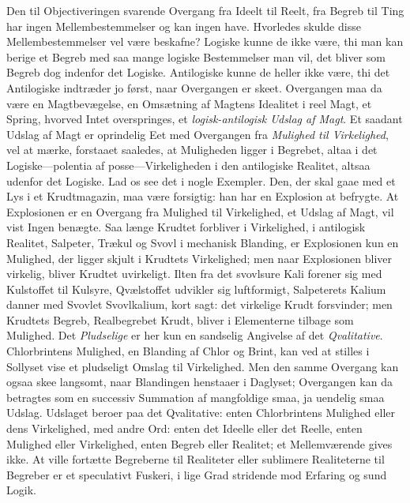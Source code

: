 \documentclass[12pt]{article}
\newcommand{\opage}[1]{\marginnote{\footnotesize\textit{[#1]}}}
\begin{document}
Den til Objectiveringen svarende Overgang fra Ideelt til Reelt, fra
Begreb til Ting har ingen Mellembestemmelser og kan ingen have.
Hvorledes skulde disse Mellembestemmelser vel være beskafne?
Logiske kunne de ikke være, thi man kan berige et Begreb med saa
mange logiske Bestemmelser man vil, det bliver som Begreb dog
indenfor det Logiske. Antilogiske kunne de heller ikke være, thi
det Antilogiske indtræder jo først, naar Overgangen er skeet.
Overgangen maa da være en Magtbevægelse, en Omsætning af Magtens
Idealitet i reel Magt, et Spring, hvorved Intet overspringes, et
\emph{logisk-antilogisk Udslag af Magt}. Et saadant Udslag af Magt
er oprindelig Eet med Overgangen fra \emph{Mulighed til Virkelighed},
vel at mærke, forstaaet saaledes, at Muligheden ligger i Begrebet,
altaa i det Logiske---polentia af posse---Virkeligheden i den
antilogiske Realitet, altsaa udenfor det Logiske. Lad os see det i
nogle Exempler. Den, der skal gaae med et Lys i et Krudtmagazin,
maa være forsigtig: han har en Explosion at befrygte. At Explosionen
er en Overgang fra Mulighed til Virkelighed, et Udslag af Magt, vil
vist Ingen benægte. Saa længe Krudtet forbliver i Virkelighed, i
antilogisk Realitet, Salpeter, Trækul og Svovl i mechanisk Blanding,
er Explosionen kun en Mulighed, der ligger skjult i Krudtets
Virkelighed; men naar Explosionen bliver virkelig, bliver Krudtet
uvirkeligt. Ilten fra det svovlsure Kali forener sig med Kulstoffet
til Kulsyre, Qvælstoffet udvikler sig luftformigt, Salpeterets
Kalium danner med Svovlet Svovlkalium, kort sagt: det virkelige
Krudt forsvinder; men Krudtets Begreb, Realbegrebet Krudt, bliver i
\opage{39} Elementerne tilbage som Mulighed. Det \emph{Pludselige} er her kun
en sandselig Angivelse af det \emph{Qvalitative}. Chlorbrintens
Mulighed, en Blanding af Chlor og Brint, kan ved at stilles i
Sollyset vise et pludseligt Omslag til Virkelighed. Men den samme
Overgang kan ogsaa skee langsomt, naar Blandingen henstaaer i
Daglyset; Overgangen kan da betragtes som en successiv Summation af
mangfoldige smaa, ja uendelig smaa Udslag. Udslaget beroer paa det
Qvalitative: enten Chlorbrintens Mulighed eller dens Virkelighed,
med andre Ord: enten det Ideelle eller det Reelle, enten Mulighed
eller Virkelighed, enten Begreb eller Realitet; et Mellemværende
gives ikke. At ville fortætte Begreberne til Realiteter eller
sublimere Realiteterne til Begreber er et speculativt Fuskeri, i
lige Grad stridende mod Erfaring og sund Logik.
\end{document}
